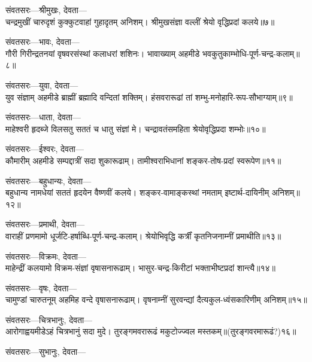 संवतसरः---श्रीमुखः, देवता---\\

चन्द्रमुखीं चारुदृशं कुक्कुटवाहां गुहादृतम् अनिशम्।
श्रीमुखसंज्ञा वल्लीं श्रेयो वृद्धिप्रदां कलये॥७॥

संवतसरः---भावः, देवता---\\

गौरी गिरीन्द्रतनयां वृषवरसंस्थां कलाधरां शशिनः।
भावाख्याम् अहमीडे भवकुतुकाम्भोधि-पूर्ण-चन्द्र-कलाम्॥८॥

संवतसरः---युवा, देवता---\\

युव संज्ञाम् अहमीडे ब्राह्मीं ब्रह्मादि वन्दितां शक्तिम्।
हंसवरारूढां तां शम्भु-मनोहारि-रूप-सौभाग्याम्॥९॥

संवतसरः---धाता, देवता---\\

माहेश्वरी हृदब्जे विलसतु सततं च धातु संज्ञां मे।
चन्द्रावतंसमहिता श्रेयोवृद्धिप्रदा शम्भोः॥१०॥

संवतसरः---ईश्वरः, देवता---\\

कौमारीम् अहमीडे सम्पद्दात्रीं सदा शुकारूढाम्।
तामीश्वराभिधानां शङ्कर-तोष-प्रदां स्वरूपेण॥११॥

संवतसरः---बहुधान्यः, देवता---\\

बहुधान्य नामधेयां सततं हृदयेन वैष्णवीं कलये।
शङ्कर-वामाङ्कस्थां नमताम् इष्टार्थ-दायिनीम् अनिशम्॥१२॥

संवतसरः---प्रमाथी, देवता---\\

वाराहीं प्रणमामो धूर्जटि-हर्षाब्धि-पूर्ण-चन्द्र-कलाम्।
श्रेयोभिवृद्धि कर्त्रीं कृतनिजनाम्नीं प्रमाथीति॥१३॥

संवतसरः---विक्रमः, देवता---\\

माहेन्द्रीं कलयामो विक्रम-संज्ञां वृषासनारूढाम्।
भासुर-चन्द्र-किरीटां भक्ताभीष्टप्रदां शान्त्यै॥१४॥

संवतसरः---वृषः, देवता---\\

चामुण्डां चारुतनूम् अहमिह वन्दे वृषासनारूढाम्।
वृषनाम्नीं सुरवन्द्यां दैत्यकुल-ध्वंसकारिणीम् अनिशम्॥१५॥

संवतसरः---चित्रभानुः, देवता---\\

आरोगाह्वयमीडेऽहं चित्रभानुं सदा मुदे।
तुरङ्गमवरारूढं मकुटोज्ज्वल मस्तकम्॥(तुरङ्गवरमारूढं?)१६॥

संवतसरः---सुभानुः, देवता---\\

